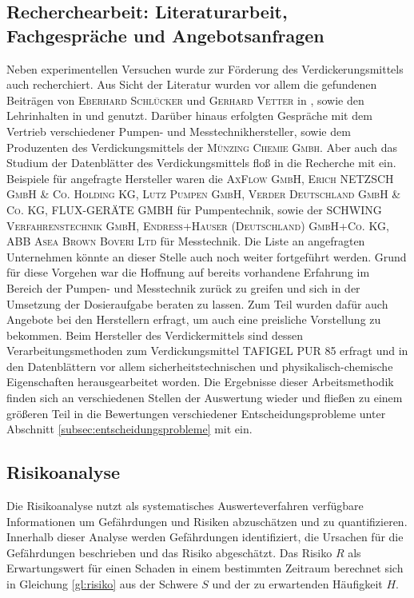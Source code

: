 \subsection{Recherchearbeit: Literaturarbeit, Fachgespräche und Angebotsanfragen}
Neben experimentellen Versuchen wurde zur Förderung des Verdickerungsmittels auch recherchiert. Aus Sicht der Literatur wurden vor allem die  gefundenen Beiträgen von \textsc{Eberhard Schlücker} und \textsc{Gerhard Vetter} in \cite{Vetter.2002}, sowie den Lehrinhalten in \cite{Ignatowitz.2015} und \cite{Bierwerth.2019} genutzt. Darüber hinaus erfolgten Gespräche mit dem Vertrieb verschiedener Pumpen- und Messtechnikhersteller, sowie dem Produzenten des Verdickungsmittels der \textsc{Münzing Chemie Gmbh}. Aber auch das Studium der Datenblätter des Verdickungsmittels floß in die Recherche mit ein. \linebreak 
Beispiele für angefragte Hersteller waren die \textsc{AxFlow GmbH, Erich NETZSCH GmbH \& Co. Holding KG, Lutz Pumpen GmbH, Verder Deutschland GmbH \& Co. KG, FLUX-GERÄTE GMBH} für Pumpentechnik, sowie der \textsc{SCHWING Verfahrenstechnik GmbH, Endress+Hauser (Deutschland) GmbH+Co. KG, ABB Asea Brown Boveri Ltd} für Messtechnik. Die Liste an angefragten Unternehmen könnte an dieser Stelle auch noch weiter fortgeführt werden. Grund für diese Vorgehen war die Hoffnung auf bereits vorhandene Erfahrung im Bereich der Pumpen- und Messtechnik zurück zu greifen und sich in der Umsetzung der Dosieraufgabe beraten zu lassen. Zum Teil wurden dafür auch Angebote bei den Herstellern erfragt, um auch eine preisliche Vorstellung zu bekommen. \linebreak
Beim Hersteller des Verdickermittels sind dessen Verarbeitungsmethoden zum Verdickungsmittel TAFIGEL PUR 85 erfragt und in den Datenblättern vor allem sicherheitstechnischen und physikalisch-chemische Eigenschaften herausgearbeitet worden.\linebreak
Die Ergebnisse dieser Arbeitsmethodik finden sich an verschiedenen Stellen der Auswertung wieder und fließen zu einem größeren Teil in die Bewertungen verschiedener Entscheidungsprobleme unter Abschnitt \ref{subsec:entscheidungsprobleme} mit ein.

\subsection{Risikoanalyse}
Die Risikoanalyse nutzt als systematisches Auswerteverfahren verfügbare Informationen um Gefährdungen und Risiken abzuschätzen und zu quantifizieren. Innerhalb dieser Analyse werden Gefährdungen identifiziert, die Ursachen für die Gefährdungen beschrieben und das Risiko abgeschätzt. Das Risiko $R$ als Erwartungswert für einen Schaden in einem bestimmten Zeitraum berechnet sich in Gleichung \eqref{gl:risiko} aus der Schwere $S$ und der zu erwartenden Häufigkeit $H$. \cite{Neumann.2010}

